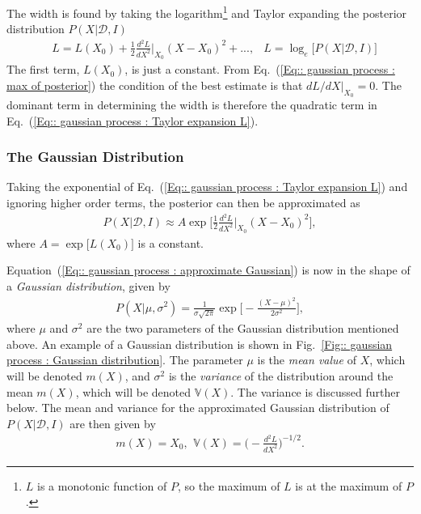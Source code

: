 \documentclass[twoside,english]{uiofysmaster}
\begin{document}
{The width is found by taking the logarithm\footnote{$L$ is a monotonic function of $P$, so the maximum of $L$ is at the maximum of $P$.} and Taylor expanding the posterior distribution $P(X| \mathcal{D}, I)$
\begin{align}
&L = L(X_0) + \frac{1}{2} \frac{d^2L}{dX^2}\Big|_{X_0} (X-X_0)^2 +... ,&L = \log_e \Big[P(X | \mathcal{D}, I ) \Big]\label{Eq:: gaussian process : Taylor expansion L}
\end{align}
The first term, $L(X_0)$, is just a constant. From Eq.~(\ref{Eq:: gaussian process : max of posterior}) the condition of the best estimate is that $dL/dX|_{X_0} =0$. The dominant term in determining the width is therefore the quadratic term in Eq.~(\ref{Eq:: gaussian process : Taylor expansion L}).

\subsubsection{The Gaussian Distribution}\label{Sec:: gaussian process : The Gaussian Distribution}

Taking the exponential of Eq.~(\ref{Eq:: gaussian process : Taylor expansion L}) and ignoring higher order terms, the posterior can then be approximated as
\begin{align}\label{Eq:: gaussian process : approximate Gaussian}
P(X | \mathcal{D}, I) \approx A \exp \Bigg[ \frac{1}{2} \frac{d^2L}{dX^2}\Big|_{X_0} (X-X_0)^2 \Bigg], 
\end{align} 
where $A = \exp \big[L(X_0) \big]$ is a constant. 

Equation~(\ref{Eq:: gaussian process : approximate Gaussian}) is now in the shape of a \textit{Gaussian distribution}, given by
\begin{align}
P(X| \mu, \sigma^2) = \frac{1}{\sigma \sqrt{2 \pi}} \exp \Bigg[ - \frac{(X- \mu)^2}{2 \sigma^2} \Bigg],
\end{align}
where $\mu$ and $\sigma^2$ are the two parameters of the Gaussian distribution mentioned above. An example of a Gaussian distribution is shown in Fig.~\ref{Fig:: gaussian process : Gaussian distribution}. The parameter $\mu$ is the \textit{mean value} of $X$, which will be denoted $ m(X)$, and $\sigma^2$ is the \textit{variance} of the distribution around the mean $m(X)$, which will be denoted $\mathbb{V}(X)$. The variance is discussed further below. The mean and variance for the approximated Gaussian distribution of $P(X|\mathcal{D}, I)$ are then given by
\begin{align}
m(X) = X_0\text{, }~ \mathbb{V}(X) = \Big( - \frac{d^2L}{dX^2} \Big)^{-1/2}.
\end{align}

}
\end{document}
